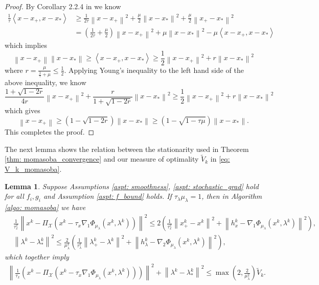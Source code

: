 \documentclass[10pt]{article}
\newtheorem{lemma}{Lemma}[section]
\theoremstyle{remark}
\newcommand{\cX}{\mathcal{X}}
\newcommand{\norm}[1]{\left\|#1\right\|}
\def\<#1,#2>{\left\langle #1,#2\right\rangle}
\begin{document}
\begin{proof}
    By Corollary 2.2.4 in \cite{nesterov2018lectures} we know
    \begin{align*}
        \frac{1}{\tau}\<x-x_+, x - x_*> &\geq \frac{1}{2\tau}\norm{x - x_+}^2 + \frac{\mu}{2}\norm{x - x_*}^2 + \frac{\mu}{2}\norm{x_+ - x_*}^2\\
        &= \left(\frac{1}{2\tau} + \frac{\mu}{2}\right)\norm{x - x_+}^2 + \mu\norm{x - x_*}^2 - \mu\<x - x_+, x - x_*>
    \end{align*}
    which implies
    \[
        \norm{x - x_+}\norm{x - x_*}\geq \<x-x_+, x - x_*> \geq \frac{1}{2}\norm{x - x_+}^2 + r\norm{x - x_*}^2
    \]
    where $r = \frac{\mu}{\frac{1}{\tau} + \mu}\leq \frac{1}{2}$. Applying Young's inequality to the left hand side of the above inequality, we know
    \[
        \frac{1 + \sqrt{1-2r}}{4r}\norm{x - x_+}^2 + \frac{r}{1 + \sqrt{1-2r}}\norm{x - x_*}^2\geq \frac{1}{2}\norm{x - x_+}^2 + r\norm{x - x_*}^2
    \]
    which gives
    \[
        \norm{x - x_+}\geq \left(1 - \sqrt{1-2r}\right)\norm{x - x_*}\geq \left(1 - \sqrt{1 - \tau\mu}\right)\norm{x - x_*}.
    \]
    This completes the proof.
\end{proof}
The next lemma shows the relation between the stationarity used in Theorem \ref{thm: momasoba_convergence} and our measure of optimality $\tilde V_k$ in \eqref{eq: V_k_momasoba}.
\begin{lemma}\label{lem: lambda_convergence}
    Suppose Assumptions \ref{aspt: smoothness}, \ref{aspt: stochastic_grad} hold for all $f_i, g_i$ and Assumption \ref{aspt: f_bound} holds. If $\tau_{\lambda}\mu_{\lambda} = 1$, then in Algorithm \ref{algo: momasoba} we have
    \begin{align*}
        &\frac{1}{\tau_x^2}\norm{x^k - \Pi_{\cX}\left(x^k - \tau_x\nabla_1\Phi_{\mu_{\lambda}}(x^k, \lambda^k)\right) }^2\leq 2\left(\frac{1}{\tau_x^2}\norm{x_+^k - x^k}^2 + \norm{h_x^k - \nabla_1\Phi_{\mu_{\lambda}}(x^k, \lambda^k) }^2\right),\\
            &\norm{\lambda^k - \lambda_*^k}^2\leq \frac{2}{\mu_{\lambda}^2}\left(\frac{1}{\tau_{\lambda}^2}\norm{\lambda_+^k - \lambda^k}^2 + \norm{h_{\lambda}^k - \nabla_2\Phi_{\mu_{\lambda}}(x^k, \lambda^k)}^2\right),
    \end{align*}
    which together imply
    \begin{align*}
        \norm{\frac{1}{\tau_x}\left(x^k - \Pi_{\cX}\left(x^k - \tau_x\nabla_1\Phi_{\mu_{\lambda}}(x^k, \lambda^k)\right) \right)}^2 + \norm{\lambda^k - \lambda_*^k}^2\leq\max\left(2, \frac{2}{\mu_{\lambda}^2}\right)\tilde V_k.
    \end{align*}
\end{lemma}
\end{document}
